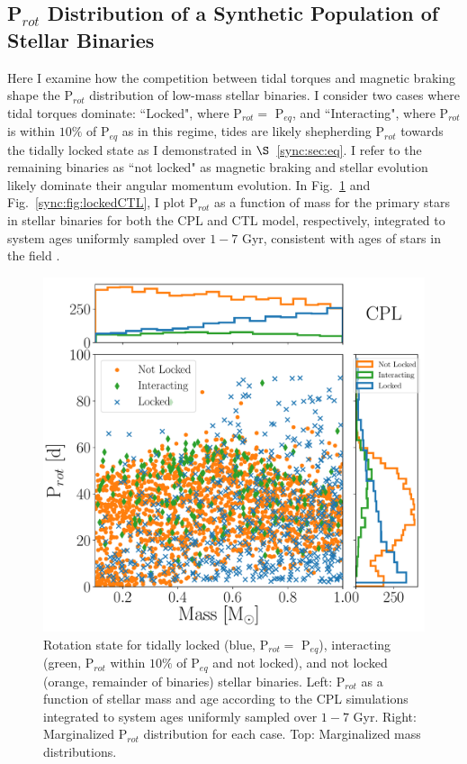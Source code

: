 \subsection{P$_{rot}$ Distribution of a Synthetic Population of Stellar Binaries} \label{sync:sec:protDist}

Here I examine how the competition between tidal torques and magnetic braking shape the P$_{rot}$ distribution of low-mass stellar binaries.  I consider two cases where tidal torques dominate: ``Locked", where P$_{rot} = $ P$_{eq}$, and ``Interacting", where P$_{rot}$ is within $10\%$ of P$_{eq}$ as in this regime, tides are likely shepherding P$_{rot}$ towards the tidally locked state as I demonstrated in $\S$~\ref{sync:sec:eq}. I refer to the remaining binaries as ``not locked" as magnetic braking and stellar evolution likely dominate their angular momentum evolution.  In Fig.~\ref{sync:fig:lockedCPL} and Fig.~\ref{sync:fig:lockedCTL}, I plot P$_{rot}$ as a function of mass for the primary stars in stellar binaries for both the CPL and CTL model, respectively, integrated to system ages uniformly sampled over $1-7$ Gyr, consistent with ages of stars in the \kepler field \citep{Chaplin2014}.  

\begin{figure}
	\includegraphics[width=\columnwidth]{lockedCPL.pdf}
   \caption{Rotation state for tidally locked (blue, P$_{rot} = $ P$_{eq}$), interacting (green, P$_{rot}$ within $10\%$ of P$_{eq}$ and not locked), and not locked (orange, remainder of binaries) stellar binaries. Left: P$_{rot}$ as a function of stellar mass and age according to the CPL simulations integrated to system ages uniformly sampled over $1-7$ Gyr. Right: Marginalized P$_{rot}$ distribution for each case. Top: Marginalized mass distributions.}%
    \label{sync:fig:lockedCPL}%
\end{figure}

